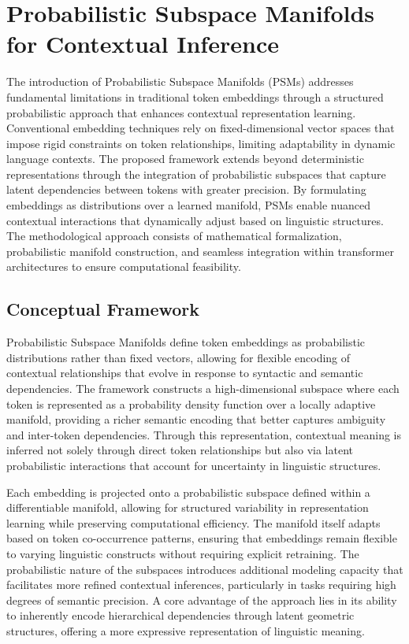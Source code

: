 \documentclass{article}
\begin{document}
\section{Probabilistic Subspace Manifolds for Contextual Inference}

The introduction of Probabilistic Subspace Manifolds (PSMs) addresses fundamental limitations in traditional token embeddings through a structured probabilistic approach that enhances contextual representation learning. Conventional embedding techniques rely on fixed-dimensional vector spaces that impose rigid constraints on token relationships, limiting adaptability in dynamic language contexts. The proposed framework extends beyond deterministic representations through the integration of probabilistic subspaces that capture latent dependencies between tokens with greater precision. By formulating embeddings as distributions over a learned manifold, PSMs enable nuanced contextual interactions that dynamically adjust based on linguistic structures. The methodological approach consists of mathematical formalization, probabilistic manifold construction, and seamless integration within transformer architectures to ensure computational feasibility.

\subsection{Conceptual Framework}

Probabilistic Subspace Manifolds define token embeddings as probabilistic distributions rather than fixed vectors, allowing for flexible encoding of contextual relationships that evolve in response to syntactic and semantic dependencies. The framework constructs a high-dimensional subspace where each token is represented as a probability density function over a locally adaptive manifold, providing a richer semantic encoding that better captures ambiguity and inter-token dependencies. Through this representation, contextual meaning is inferred not solely through direct token relationships but also via latent probabilistic interactions that account for uncertainty in linguistic structures.

Each embedding is projected onto a probabilistic subspace defined within a differentiable manifold, allowing for structured variability in representation learning while preserving computational efficiency. The manifold itself adapts based on token co-occurrence patterns, ensuring that embeddings remain flexible to varying linguistic constructs without requiring explicit retraining. The probabilistic nature of the subspaces introduces additional modeling capacity that facilitates more refined contextual inferences, particularly in tasks requiring high degrees of semantic precision. A core advantage of the approach lies in its ability to inherently encode hierarchical dependencies through latent geometric structures, offering a more expressive representation of linguistic meaning.
\end{document}

